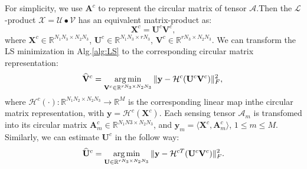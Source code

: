 \documentclass[journal,article,submit,moreauthors,pdftex,10pt,a4paper]{Definitions/mdpi}
\theoremstyle{plain}
\theoremstyle{definition}
\theoremstyle{remark}
\begin{document}
For simplicity, we use $\mathbf{A}^c$ to represent the circular matrix of tensor $\mathcal{A}$.Then the $\mathcal{L}$-product $\mathcal{X} = \mathcal{U} \bullet \mathcal{V}$ has an equivalent matrix-product as:
\begin{equation}
    \mathbf{X}^c = \mathbf{U}^c\mathbf{V}^c,
\end{equation}
where $\mathbf{X}^c \in \mathbb{R}^{N_1N_3\times N_2N_3}$, $\mathbf{U}^c \in \mathbb{R}^{N_1N_3\times rN_3}$, $\mathbf{V}^c \in \mathbb{R}^{rN_3\times N_2N_3}$. We can transform the LS minimization in Alg.\ref{alg:LS} to the corresponding circular matrix representation:
\begin{equation}
    \widehat{\mathbf{V}}^c = 
    \mathop{\arg\min}_{ \mathbf{V}^c \in \mathbb{R}^{rN_3 \times N_2N_3}} \| \mathbf{y} - \mathcal{H}^c(\mathbf{U}^c\mathbf{V}^c) \|_F^2 , \\
\end{equation}
where $\mathcal{H}^c(\cdot): \mathbb{R}^{N_1N_2 \times N_2N_3} \to \mathbb{R}^M$ is the corresponding linear map inthe circular matrix representation, with $\mathbf{y} = \mathcal{H}^c(\mathbf{X}^c)$. Each sensing tensor $\mathcal{A}_m$ is transfomed into its circular matrix $\mathbf{A}^c_m \in \mathbb{R}^{N_1N3 \times N_2N_3}$, and $\mathbf{y}_m = \langle \mathbf{X}^c, \mathbf{A}^c_m \rangle$, $1 \leq m \leq M$. Similarly, we can estimate $\mathbf{U}^c$ in the follow way:
\begin{equation}
    \widehat{\mathbf{U}}^c =
    \mathop{\arg\min}_{ \mathbf{U} \in \mathbb{R}^{rN_3 \times N_2N_3}} \| \mathbf{y} - \mathcal{H}^{cT}(\mathbf{U}^c\mathbf{V}^c) \|_F^2 . \\
\end{equation}
\end{document}
